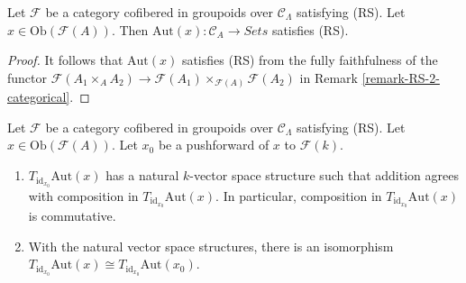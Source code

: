 \begin{lemma}
\label{lemma-Aut-functor-RS}
Let $\mathcal{F}$ be a category cofibered in groupoids over $\mathcal 
C_\Lambda$ satisfying (RS).  Let $x \in \text{Ob}(\mathcal 
F(A))$.  Then $\text{Aut}(x): \mathcal{C}_{A} \to 
\textit{Sets}$ satisfies (RS).
\end{lemma}

\begin{proof}
It follows that $\text{Aut}(x)$ satisfies (RS) from the fully 
faithfulness of the functor $\mathcal{F}(A_1 \times_{A} A_2) \to 
\mathcal{F}(A_1) \times_{\mathcal{F}(A)} \mathcal{F}(A_2)$ in Remark 
\ref{remark-RS-2-categorical}.
\end{proof}

\begin{lemma}
\label{lemma-Aut-functor-tangent-space}
Let $\mathcal{F}$ be a category cofibered in groupoids over $\mathcal 
C_\Lambda$ satisfying (RS).  Let $x \in \text{Ob}(\mathcal 
F(A))$.  Let $x_0$ be a pushforward of $x$ to $\mathcal{F}(k)$.
\begin{enumerate}
\item $T_{\text{id}_{x_0}} \text{Aut}(x)$ has a natural $k$-vector 
space structure such that addition agrees with composition in 
$T_{\text{id}_{x_0}} \text{Aut}(x)$.  In particular, composition in 
$T_{\text{id}_{x_0}} \text{Aut}(x)$ is commutative.
\item With the natural vector space structures, there is an isomorphism 
$T_{\text{id}_{x_0}} \text{Aut}(x) \cong T_{\text{id}_{x_0}} 
\text{Aut}(x_0)$.
\end{enumerate}
\end{lemma}

